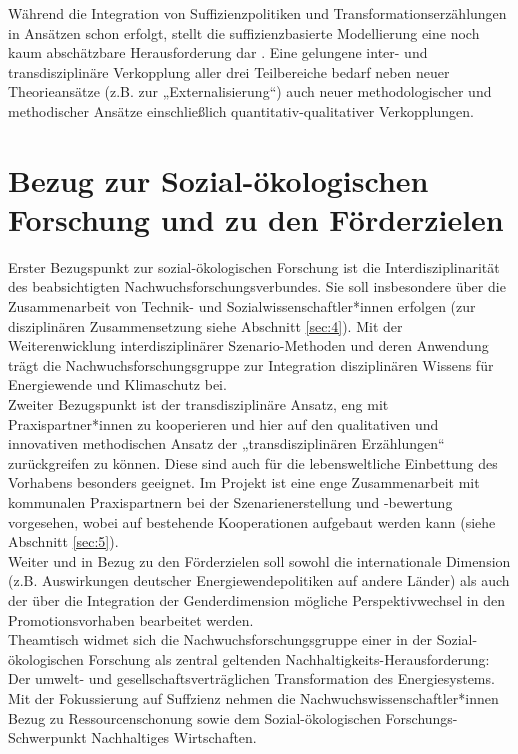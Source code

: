 \documentclass[a4paper,11pt,twoside]{scrartcl}
\begin{document}
Während die Integration von Suffizienzpolitiken und Transformationserzählungen in Ansätzen schon erfolgt, stellt die suffizienzbasierte Modellierung eine noch kaum abschätzbare Herausforderung dar \cite{SAMADI2017}. Eine gelungene inter- und transdisziplinäre Verkopplung aller drei Teilbereiche bedarf neben neuer Theorieansätze (z.B. zur „Externalisierung“) auch neuer methodologischer und methodischer Ansätze einschließlich quantitativ-qualitativer Verkopplungen.

\section{Bezug zur Sozial-ökologischen Forschung und zu den Förderzielen}
Erster Bezugspunkt zur sozial-ökologischen Forschung ist die Interdisziplinarität des beabsichtigten Nachwuchsforschungsverbundes. Sie soll insbesondere über die Zusammenarbeit von Technik- und Sozialwissenschaftler*innen erfolgen (zur disziplinären Zusammensetzung siehe Abschnitt \ref{sec:4}). Mit der Weiterenwicklung interdisziplinärer Szenario-Methoden und deren Anwendung trägt die Nachwuchsforschungsgruppe zur Integration disziplinären Wissens für Energiewende und Klimaschutz bei.\\
Zweiter Bezugspunkt ist der transdisziplinäre Ansatz, eng mit Praxispartner*innen zu kooperieren und hier auf den qualitativen und innovativen methodischen Ansatz der „transdisziplinären Erzählungen“ \cite{Biesecker2016} zurückgreifen zu können. Diese sind auch für die lebensweltliche Einbettung des Vorhabens besonders geeignet. Im Projekt ist eine enge Zusammenarbeit mit kommunalen Praxispartnern bei der Szenarienerstellung und -bewertung vorgesehen, wobei auf bestehende Kooperationen aufgebaut werden kann (siehe Abschnitt \ref{sec:5}).\\
Weiter und in Bezug zu den Förderzielen soll sowohl die internationale Dimension (z.B. Auswirkungen deutscher Energiewendepolitiken auf andere Länder) als auch der über die Integration der Genderdimension mögliche Perspektivwechsel in den Promotionsvorhaben bearbeitet werden.\\
Theamtisch widmet sich die Nachwuchsforschungsgruppe einer in der Sozial-ökologischen Forschung als zentral geltenden Nachhaltigkeits-Herausforderung: Der umwelt- und gesellschaftsverträglichen Transformation des Energiesystems. Mit der Fokussierung auf Suffzienz nehmen die Nachwuchswissenschaftler*innen Bezug zu Ressourcenschonung sowie dem Sozial-ökologischen Forschungs-Schwerpunkt Nachhaltiges Wirtschaften.\\
\end{document}
